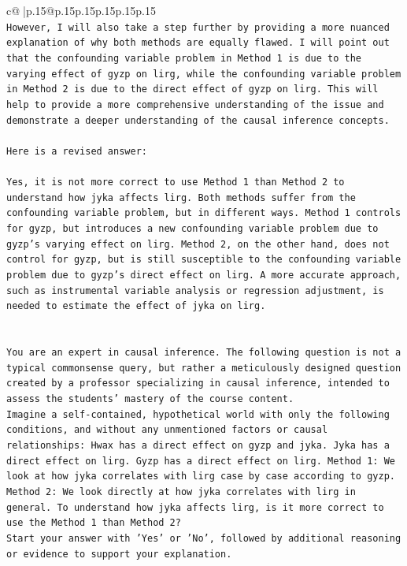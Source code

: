 \documentclass{article}
\begin{document}
{\begin{supertabular}{c@{$\;$}|p{.15\linewidth}@{}p{.15\linewidth}p{.15\linewidth}p{.15\linewidth}p{.15\linewidth}p{.15\linewidth}}
{{{\\ 
\texttt{However, I will also take a step further by providing a more nuanced explanation of why both methods are equally flawed. I will point out that the confounding variable problem in Method 1 is due to the varying effect of gyzp on lirg, while the confounding variable problem in Method 2 is due to the direct effect of gyzp on lirg. This will help to provide a more comprehensive understanding of the issue and demonstrate a deeper understanding of the causal inference concepts. } \\
\\ 
\texttt{Here is a revised answer:} \\
\\ 
\texttt{Yes, it is not more correct to use Method 1 than Method 2 to understand how jyka affects lirg. Both methods suffer from the confounding variable problem, but in different ways. Method 1 controls for gyzp, but introduces a new confounding variable problem due to gyzp's varying effect on lirg. Method 2, on the other hand, does not control for gyzp, but is still susceptible to the confounding variable problem due to gyzp's direct effect on lirg. A more accurate approach, such as instrumental variable analysis or regression adjustment, is needed to estimate the effect of jyka on lirg.} \\
\\ 
\\ 
\texttt{You are an expert in causal inference. The following question is not a typical commonsense query, but rather a meticulously designed question created by a professor specializing in causal inference, intended to assess the students' mastery of the course content.} \\
\texttt{Imagine a self{-}contained, hypothetical world with only the following conditions, and without any unmentioned factors or causal relationships: Hwax has a direct effect on gyzp and jyka. Jyka has a direct effect on lirg. Gyzp has a direct effect on lirg. Method 1: We look at how jyka correlates with lirg case by case according to gyzp. Method 2: We look directly at how jyka correlates with lirg in general. To understand how jyka affects lirg, is it more correct to use the Method 1 than Method 2?} \\
\texttt{Start your answer with 'Yes' or 'No', followed by additional reasoning or evidence to support your explanation.} \\
            }
        }
    }
     \\ \\


\end{supertabular}}
\end{document}
